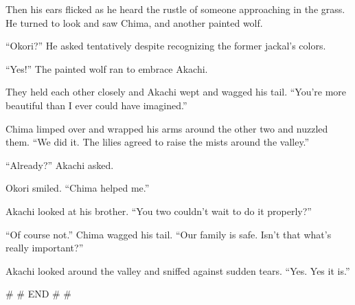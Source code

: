 Then his ears flicked as he heard the rustle of someone approaching in the grass. He turned to look and saw Chima, and another painted wolf.

``Okori?'' He asked tentatively despite recognizing the former jackal's colors.

``Yes!'' The painted wolf ran to embrace Akachi.

They held each other closely and Akachi wept and wagged his tail. ``You're more beautiful than I ever could have imagined.''

Chima limped over and wrapped his arms around the other two and nuzzled them. ``We did it. The lilies agreed to raise the mists around the valley.''

``Already?'' Akachi asked.

Okori smiled. ``Chima helped me.''

Akachi looked at his brother. ``You two couldn't wait to do it properly?''

``Of course not.'' Chima wagged his tail. ``Our family is safe. Isn't that what's really important?''

Akachi looked around the valley and sniffed against sudden tears. ``Yes. Yes it is.''

\# \# END \# \#
